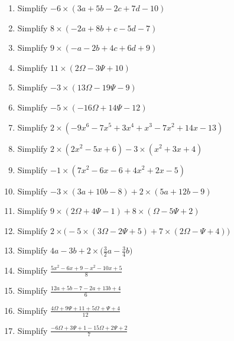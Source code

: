 \documentclass[16pt]{article}
\theoremstyle{remark}
\begin{document}
\begin{enumerate}
\item Simplify $\displaystyle{-6\times(3a+5b-2c+7d-10)}$
\vspace{5cm}
\newpage
\item Simplify $\displaystyle{8\times(-2a+8b+c-5d-7)}$
\vspace{5cm}
\item Simplify $\displaystyle{9\times(-a-2b+4c+6d+9)}$
\vspace{5cm}
\item Simplify $\displaystyle{11\times(2\Omega-3\Psi+10)}$
\vspace{5cm}
\item Simplify $\displaystyle{-3\times(13\Omega-19\Psi-9)}$
\vspace{5cm}
\newpage
\item Simplify $\displaystyle{-5\times(-16\Omega+14\Psi-12)}$
\vspace{5cm}
\item Simplify $\displaystyle{2\times(-9x^6-7x^5+3x^4+x^3-7x^2+14x-13)}$
\vspace{5cm}
\item Simplify $\displaystyle{2\times(2x^2-5x+6)-3\times(x^2+3x+4)}$
\vspace{5cm}

\item Simplify $\displaystyle{-1\times(7x^2-6x-6+4x^2+2x-5)}$
\vspace{5cm}
\newpage

\item Simplify $\displaystyle{-3\times(3a+10b-8)+2\times(5a+12b-9)}$
\vspace{5cm}

\item Simplify $\displaystyle{9\times(2\Omega+4\Psi-1)+8\times(\Omega-5\Psi+2)}$
\vspace{5cm}

\item Simplify $\displaystyle{2\times\bigg(-5\times(3\Omega-2\Psi+5)+7\times(2\Omega-\Psi+4)\bigg)}$
\vspace{5cm}

\item Simplify $\displaystyle{4a-3b + 2\times\bigg(\frac{3}{2}a -\frac{3}{4}b\bigg)}$
\vspace{5cm}

\newpage

\item Simplify $\displaystyle{\frac{5x^2-6x+9-x^2-10x+5}{8}}$
\vspace{5cm}
\item Simplify $\displaystyle{\frac{12a+5b-7-2a+13b+4}{6}}$
\vspace{5cm}
\item Simplify $\displaystyle{\frac{4\Omega+9\Psi+11+5\Omega+\Psi+4}{12}}$
\vspace{5cm}
\item Simplify $\displaystyle{\frac{-6\Omega+3\Psi+1-15\Omega+2\Psi+2}{7}}$
\vspace{5cm}
\end{enumerate}
\end{document}
